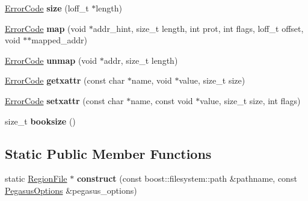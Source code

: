 \begin{DoxyCompactItemize}
\item 
\hyperlink{group__ERRORCODES_ga6263a3c9a0b8d36aea21cdd835ac99fe}{Error\+Code} {\bfseries size} (loff\+\_\+t $\ast$length)\hypertarget{classalps_1_1TmpfsRegionFile_a3595a7f5562fb4979dcc8d0e3a527b0d}{}\label{classalps_1_1TmpfsRegionFile_a3595a7f5562fb4979dcc8d0e3a527b0d}

\item 
\hyperlink{group__ERRORCODES_ga6263a3c9a0b8d36aea21cdd835ac99fe}{Error\+Code} {\bfseries map} (void $\ast$addr\+\_\+hint, size\+\_\+t length, int prot, int flags, loff\+\_\+t offset, void $\ast$$\ast$mapped\+\_\+addr)\hypertarget{classalps_1_1TmpfsRegionFile_aecbcd4faa44978e67c2c035ad625f50f}{}\label{classalps_1_1TmpfsRegionFile_aecbcd4faa44978e67c2c035ad625f50f}

\item 
\hyperlink{group__ERRORCODES_ga6263a3c9a0b8d36aea21cdd835ac99fe}{Error\+Code} {\bfseries unmap} (void $\ast$addr, size\+\_\+t length)\hypertarget{classalps_1_1TmpfsRegionFile_ad1239e1fbf298cf231eaab669804a969}{}\label{classalps_1_1TmpfsRegionFile_ad1239e1fbf298cf231eaab669804a969}

\item 
\hyperlink{group__ERRORCODES_ga6263a3c9a0b8d36aea21cdd835ac99fe}{Error\+Code} {\bfseries getxattr} (const char $\ast$name, void $\ast$value, size\+\_\+t size)\hypertarget{classalps_1_1TmpfsRegionFile_ac9ff7ea5c734c98a6e083350c17acf54}{}\label{classalps_1_1TmpfsRegionFile_ac9ff7ea5c734c98a6e083350c17acf54}

\item 
\hyperlink{group__ERRORCODES_ga6263a3c9a0b8d36aea21cdd835ac99fe}{Error\+Code} {\bfseries setxattr} (const char $\ast$name, const void $\ast$value, size\+\_\+t size, int flags)\hypertarget{classalps_1_1TmpfsRegionFile_af122bc9e41a0ad54b3148999c61db27e}{}\label{classalps_1_1TmpfsRegionFile_af122bc9e41a0ad54b3148999c61db27e}

\item 
size\+\_\+t {\bfseries booksize} ()\hypertarget{classalps_1_1TmpfsRegionFile_acff37cfb3764b1d9bd889bd15f95b884}{}\label{classalps_1_1TmpfsRegionFile_acff37cfb3764b1d9bd889bd15f95b884}

\end{DoxyCompactItemize}
\subsection*{Static Public Member Functions}
\begin{DoxyCompactItemize}
\item 
static \hyperlink{classalps_1_1RegionFile}{Region\+File} $\ast$ {\bfseries construct} (const boost\+::filesystem\+::path \&pathname, const \hyperlink{structalps_1_1PegasusOptions}{Pegasus\+Options} \&pegasus\+\_\+options)\hypertarget{classalps_1_1TmpfsRegionFile_a7bf70ed90d3632cac14e8238d81fd57c}{}\label{classalps_1_1TmpfsRegionFile_a7bf70ed90d3632cac14e8238d81fd57c}

\end{DoxyCompactItemize}
